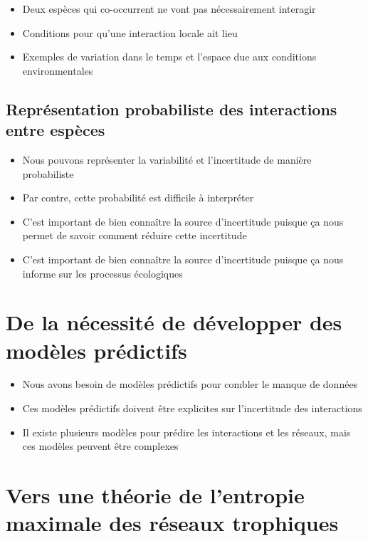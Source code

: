 \begin{itemize}
    \item Deux espèces qui co-occurrent ne vont pas nécessairement interagir
    \item Conditions pour qu'une interaction locale ait lieu 
    \item Exemples de variation dans le temps et l'espace due aux conditions environmentales 
\end{itemize}

\subsection{Représentation probabiliste des interactions entre espèces} 

\begin{itemize}
    \item Nous pouvons représenter la variabilité et l'incertitude de manière probabiliste
    \item Par contre, cette probabilité est difficile à interpréter 
    \item C'est important de bien connaître la source d'incertitude puisque ça nous permet de savoir comment réduire cette incertitude
    \item C'est important de bien connaître la source d'incertitude puisque ça nous informe sur les processus écologiques 
\end{itemize}




\section{De la nécessité de développer des modèles prédictifs} 

\begin{itemize}
    \item Nous avons besoin de modèles prédictifs pour combler le manque de données 
    \item Ces modèles prédictifs doivent être explicites sur l'incertitude des interactions
    \item Il existe plusieurs modèles pour prédire les interactions et les réseaux, mais ces modèles peuvent être complexes
\end{itemize}



\section{Vers une théorie de l'entropie maximale des réseaux trophiques}

